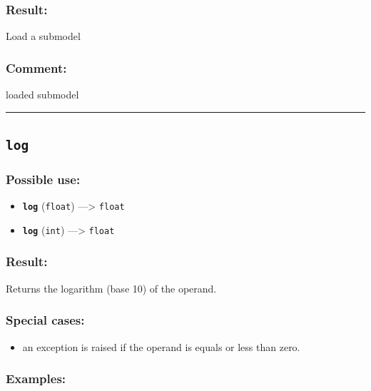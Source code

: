 \documentclass[]{book}
\providecommand{\tightlist}{%
  \setlength{\itemsep}{0pt}\setlength{\parskip}{0pt}}
\theoremstyle{definition}
\theoremstyle{definition}
\theoremstyle{definition}
\theoremstyle{remark}
\begin{document}
\subsubsection{Result:}\label{result-318}

Load a submodel

\subsubsection{Comment:}\label{comment-63}

loaded submodel

\begin{center}\rule{0.5\linewidth}{\linethickness}\end{center}

\subsection{\texorpdfstring{\texttt{log}}{log}}\label{log}

\subsubsection{Possible use:}\label{possible-use-329}

\begin{itemize}
\tightlist
\item
  \textbf{\texttt{log}} (\texttt{float}) ---\textgreater{}
  \texttt{float}
\item
  \textbf{\texttt{log}} (\texttt{int}) ---\textgreater{} \texttt{float}
\end{itemize}

\subsubsection{Result:}\label{result-319}

Returns the logarithm (base 10) of the operand.

\subsubsection{Special cases:}\label{special-cases-92}

\begin{itemize}
\tightlist
\item
  an exception is raised if the operand is equals or less than zero.
\end{itemize}

\subsubsection{Examples:}\label{examples-228}
\end{document}
